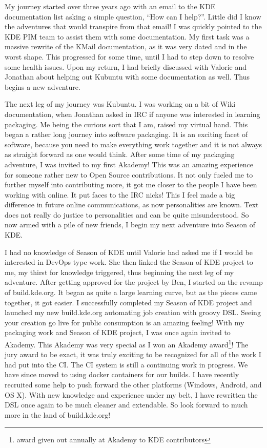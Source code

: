 

\noindent{}My journey started over three years ago with an email to the KDE documentation list asking a simple question, “How can I help?”. Little did I know the adventures that would transpire from that email! I was quickly pointed to the KDE PIM team to assist them with some documentation.  My first task was a massive rewrite of the KMail documentation, as it was very dated and in the worst shape. This progressed for some time, until I had to step down to resolve some health issues. Upon my return, I had briefly discussed with Valorie and Jonathan about helping out Kubuntu with some documentation as well. Thus begins a new adventure.

The next leg of my journey was Kubuntu. I was working on a bit of Wiki documentation, when Jonathan asked in IRC if anyone was interested in learning packaging. Me being the curious sort that I am, raised my virtual hand. This began a rather long journey into software packaging. It is an exciting facet of software, because you need to make everything work together and it is not always as straight forward as one would think. After some time of my packaging adventure, I was invited to my first Akademy! This was an amazing experience for someone rather new to Open Source contributions. It not only fueled me to further myself into contributing more, it got me closer to the people I have been working with online. It put faces to the IRC nicks! This I feel made a big difference in future online communications, as now personalities are known. Text does not really do justice to personalities and can be quite misunderstood. So now armed with a pile of new friends, I begin my next adventure into Season of KDE.

I had no knowledge of Season of KDE until Valorie had asked me if I would be interested in DevOps type work. She then linked the Season of KDE project to me, my thirst for knowledge triggered, thus beginning the next leg of my adventure. After getting approved for the project by Ben, I started on the revamp of build.kde.org. It began as quite a large learning curve, but as the pieces came together, it got easier. I successfully completed my Season of KDE project and launched my new build.kde.org automating job creation with groovy DSL.  Seeing your creation go live for public consumption is an amazing feeling! With my packaging work and Season of KDE project, I was once again invited to Akademy. This Akademy was very special as I won an Akademy award\footnote{award given out annually at Akademy to KDE contributors}! The jury award to be exact, it was truly exciting to be recognized for all of the work I had put into the CI. The CI system is still a continuing work in progress. We have since moved to using docker containers for our builds. I have recently recruited some help to push forward the other platforms (Windows, Android, and OS X). With new knowledge and experience under my belt, I have rewritten the DSL once again to be much cleaner and extendable. So look forward to much more in the land of build.kde.org!
